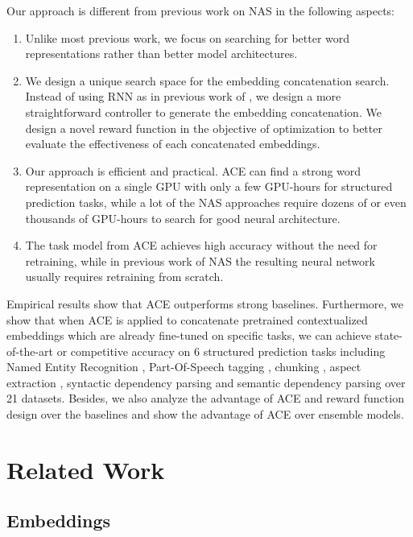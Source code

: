 \documentclass{article} \usepackage{iclr2021_conference,times}
\begin{document}
Our approach is different from previous work on NAS in the following aspects:
\begin{enumerate}[leftmargin=*]
	\item Unlike most previous work, we focus on searching for better word representations rather than better model architectures.
    \item We design a unique search space for the embedding concatenation search. Instead of using RNN as in previous work of \citet{zoph2016neural}, we design a more straightforward controller to generate the embedding concatenation. We design a novel reward function in the objective of optimization to better evaluate the effectiveness of each concatenated embeddings.
    \item Our approach is efficient and practical. ACE can find a strong word representation on a single GPU with only a few GPU-hours for structured prediction tasks, while a lot of the NAS approaches require dozens of or even thousands of GPU-hours to search for good neural architecture.
    \item The task model from ACE achieves high accuracy without the need for retraining, while in previous work of NAS the resulting neural network usually requires retraining from scratch.
\end{enumerate}

Empirical results show that ACE outperforms strong baselines. 
Furthermore, we show that when ACE is applied to concatenate pretrained contextualized embeddings which are already fine-tuned on specific tasks, we can achieve
state-of-the-art or competitive accuracy on 6 structured prediction tasks including Named Entity Recognition \citep{Sundheim1995NamedET}, Part-Of-Speech tagging \citep{derose-1988-grammatical}, chunking \citep{tjong-kim-sang-buchholz-2000-introduction}, aspect extraction \citep{10.1145/1014052.1014073}, syntactic dependency parsing \citep{arrive1969elements} and semantic dependency parsing \citep{oepensemeval} over 21 datasets.
Besides, we also analyze the advantage of ACE and reward function design over the baselines and show the advantage of ACE over ensemble models. 

\section{Related Work}
\subsection{Embeddings}
\end{document}

